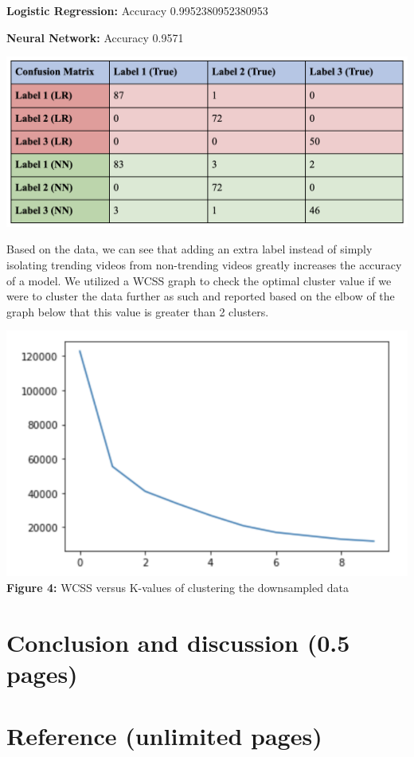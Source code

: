 \documentclass{article}
\begin{document}
\textbf{Logistic Regression:} Accuracy 0.9952380952380953
\par \textbf{Neural Network:} Accuracy 0.9571 
\begin{center}
\includegraphics[scale=.7]{multi_label.png}\\
\end{center}
\quad Based on the data, we can see that adding an extra label instead of simply isolating trending videos from non-trending videos greatly increases the accuracy of a model. We utilized a WCSS graph to check the optimal cluster value if we were to cluster the data further as such and reported based on the elbow of the graph below that this value is greater than 2 clusters.\\
\begin{center}
\includegraphics[scale=.8]{figure4.png}\\

\textbf{Figure 4:} WCSS versus K-values of clustering the downsampled data
\end{center}
\section*{Conclusion and discussion (0.5 pages)}
\section*{Reference (unlimited pages)}
\end{document}
